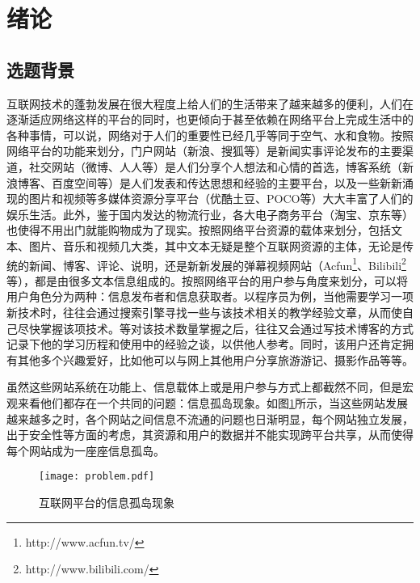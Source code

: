 \section{绪论}

\subsection{选题背景}
互联网技术的蓬勃发展在很大程度上给人们的生活带来了越来越多的便利，人们在逐渐适应网络这样的平台的同时，也更倾向于甚至依赖在网络平台上完成生活中的各种事情，可以说，网络对于人们的重要性已经几乎等同于空气、水和食物。按照网络平台的功能来划分，门户网站（新浪、搜狐等）是新闻实事评论发布的主要渠道，社交网站（微博、人人等）是人们分享个人想法和心情的首选，博客系统（新浪博客、百度空间等）是人们发表和传达思想和经验的主要平台，以及一些新新涌现的图片和视频等多媒体资源分享平台（优酷土豆、POCO等）大大丰富了人们的娱乐生活。此外，鉴于国内发达的物流行业，各大电子商务平台（淘宝、京东等）也使得不用出门就能购物成为了现实。按照网络平台资源的载体来划分，包括文本、图片、音乐和视频几大类，其中文本无疑是整个互联网资源的主体，无论是传统的新闻、博客、评论、说明，还是新新发展的弹幕视频网站（Acfun\footnote{http://www.acfun.tv/}、Bilibili\footnote{http://www.bilibili.com/}等），都是由很多文本信息组成的。按照网络平台的用户参与角度来划分，可以将用户角色分为两种：信息发布者和信息获取者。以程序员为例，当他需要学习一项新技术时，往往会通过搜索引擎寻找一些与该技术相关的教学经验文章，从而使自己尽快掌握该项技术。等对该技术数量掌握之后，往往又会通过写技术博客的方式记录下他的学习历程和使用中的经验之谈，以供他人参考。同时，该用户还肯定拥有其他多个兴趣爱好，比如他可以与网上其他用户分享旅游游记、摄影作品等等。

虽然这些网站系统在功能上、信息载体上或是用户参与方式上都截然不同，但是宏观来看他们都存在一个共同的问题：信息孤岛现象。如图\ref{fig:problem}所示，当这些网站发展越来越多之时，各个网站之间信息不流通的问题也日渐明显，每个网站独立发展，出于安全性等方面的考虑，其资源和用户的数据并不能实现跨平台共享，从而使得每个网站成为一座座信息孤岛。

\begin{figure}
\centering
\texttt{[image: problem.pdf]}
\caption{互联网平台的信息孤岛现象}
\label{fig:problem}
\end{figure}

